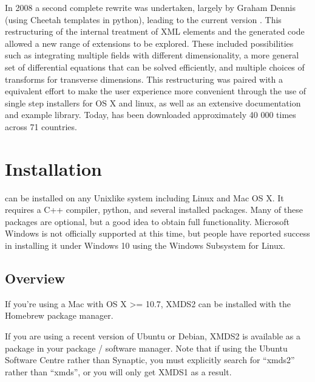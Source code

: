 \documentclass[letterpaper,10pt,english]{sphinxmanual}
\begin{document}
\sphinxAtStartPar
In 2008 a second complete rewrite was undertaken, largely by Graham Dennis (using Cheetah templates in python), leading to the current version .  This restructuring of the internal treatment of XML elements and the generated code allowed a new range of extensions to be explored.  These included possibilities such as integrating multiple fields with different dimensionality, a more general set of differential equations that can be solved efficiently, and multiple choices of transforms for transverse dimensions.  This restructuring was paired with a equivalent effort to make the user experience more convenient through the use of single step installers for OS X and linux, as well as an extensive documentation and example library.  Today,  has been downloaded approximately 40 000 times across 71 countries.

\ignorespaces 

\chapter{Installation}
\label{\detokenize{installation:installation}}\label{\detokenize{installation:index-0}}\label{\detokenize{installation:id1}}\label{\detokenize{installation::doc}}
\sphinxAtStartPar
{} can be installed on any Unix\sphinxhyphen{}like system including Linux and Mac OS X.  It requires a C++ compiler, python, and several installed packages.  Many of these packages are optional, but a good idea to obtain full functionality. Microsoft Windows is not officially supported at this time, but people have reported success in installing it under Windows 10 using the Windows Subsystem for Linux.


\section{Overview}
\label{\detokenize{installation:overview}}
\sphinxAtStartPar
If you’re using a Mac with OS X \textgreater{}= 10.7, XMDS2 can be installed with the Homebrew package manager.

\sphinxAtStartPar
If you are using a recent version of Ubuntu or Debian, XMDS2 is available as a package in your package / software manager. Note that if using the Ubuntu Software Centre rather than Synaptic, you must explicitly search for “xmds2” rather than “xmds”, or you will only get XMDS1 as a result.
\end{document}
